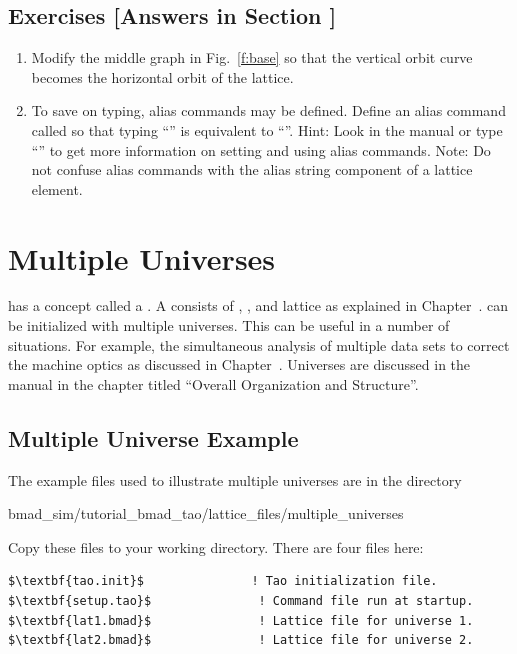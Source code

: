\documentclass{hitec}     %
\newcommand{\Section}[1]{\section{#1}\vspace*{-1ex}}
\begin{document}
\vspace{1in}

\subsection{Exercises [Answers in Section ]}
\label{s:three.lat.ex}

\begin{enumerate}[label=\thesection.\arabic{enumi}]
\item
Modify the middle graph in Fig.~\ref{f:base} so that the vertical orbit curve becomes the horizontal
orbit of the  lattice.
\item
To save on typing, alias commands may be defined. Define an alias command called  so that
typing ``'' is equivalent to ``''. Hint: Look in the
manual or type ``'' to get more information on setting and using alias commands.
Note: Do not confuse \tao alias commands with the alias string component of a lattice element.
\end{enumerate}

\newpage

\Section{Multiple Universes}
\label{s:multi.uni}

\tao has a concept called a . A  consists of , , and
 lattice as explained in Chapter~. \tao can be initialized with multiple
universes. This can be useful in a number of situations. For example, the simultaneous analysis of
multiple data sets to correct the machine optics as discussed in Chapter~.
Universes are discussed in the \tao manual in the chapter titled ``Overall Organization and Structure''.

\subsection{Multiple Universe Example}

The example files used to illustrate multiple universes are in the directory 
\begin{code}
bmad_sim/tutorial_bmad_tao/lattice_files/multiple_universes
\end{code}
Copy these files to your working directory. There are four files here:
\begin{lstlisting}[mathescape]
$\textbf{tao.init}$               ! Tao initialization file.
$\textbf{setup.tao}$               ! Command file run at startup.
$\textbf{lat1.bmad}$               ! Lattice file for universe 1.
$\textbf{lat2.bmad}$               ! Lattice file for universe 2.
\end{lstlisting}
\end{document}
